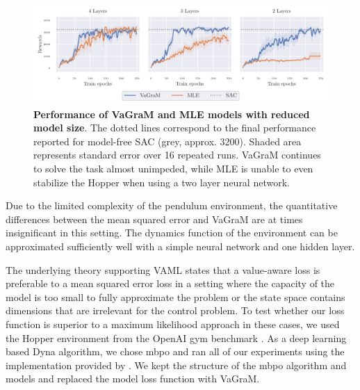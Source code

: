 \begin{figure}[t]
\begin{center}
    \includegraphics[clip, trim=0.2cm 0.0cm 0.4cm 0.0cm, width=1.\linewidth]{figures/vagram/fig_2.pdf}
\end{center}
    \caption{\textbf{Performance of VaGraM and MLE models with reduced model size}. The dotted lines correspond to the final performance reported for model-free SAC (grey, approx. 3200). Shaded area represents standard error over 16 repeated runs. VaGraM continues to solve the task almost unimpeded, while MLE is unable to even stabilize the Hopper when using a two layer neural network.}
    \label{fig:vagram:pendulum_small}
\end{figure}
Due to the limited complexity of the pendulum environment, the quantitative differences between the mean squared error and VaGraM are at times insignificant in this setting.
The dynamics function of the environment can be approximated sufficiently well with a simple neural network and one hidden layer.

The underlying theory supporting VAML states that a value-aware loss is preferable to a mean squared error loss in a setting where the capacity of the model is too small to fully approximate the problem or the state space contains dimensions that are irrelevant for the control problem.
To test whether our loss function is superior to a maximum likelihood approach in these cases, we used the Hopper environment from the OpenAI gym benchmark \parencite{brockman2016openai}. 
As a deep learning based Dyna algorithm, we chose \ac{mbpo} \parencite{janner2019mbpo} and ran all of our experiments using the implementation provided by \textcite{pineda2021mbrl}.
We kept the structure of the \ac{mbpo} algorithm and models and replaced the model loss function with VaGraM.

